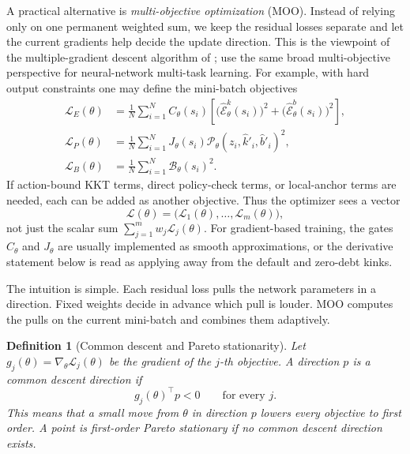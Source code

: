 \documentclass[11pt]{article}
\newtheorem{definition}{Definition}
\newcommand{\1}{\mathbf{1}}
\begin{document}
A practical alternative is \emph{multi-objective optimization} (MOO). Instead
of relying only on one permanent weighted sum, we keep the residual losses
separate and let the current gradients help decide the update direction. This
is the viewpoint of the multiple-gradient descent algorithm of
\citet{desideri2012mgda}; \citet{sener2018mtlmoo} use the same broad
multi-objective perspective for neural-network multi-task learning. For example,
with hard output constraints one may define the mini-batch objectives
\begin{align}
  \mathcal L_E(\theta)
  &=
  \frac{1}{N}\sum_{i=1}^N
  C_\theta(s_i)
  \left[
    \bigl(\widehat{\mathcal E}^k_\theta(s_i)\bigr)^2
    +\bigl(\widehat{\mathcal E}^b_\theta(s_i)\bigr)^2
  \right],
  \label{eq:moo-euler-loss}\\
  \mathcal L_P(\theta)
  &=
  \frac{1}{N}\sum_{i=1}^N
  J_\theta(s_i)
  \mathcal P_\theta(z_i,\widehat k'_i,\widehat b'_i)^2,
  \label{eq:moo-pricing-loss}\\
  \mathcal L_B(\theta)
  &=
  \frac{1}{N}\sum_{i=1}^N
  \mathcal B_\theta(s_i)^2.
  \label{eq:moo-bellman-loss}
\end{align}
If action-bound KKT terms, direct policy-check terms, or local-anchor terms are
needed, each can be added as another objective. Thus the optimizer sees a vector
\[
  \mathcal L(\theta)
  =
  \bigl(\mathcal L_1(\theta),\ldots,\mathcal L_m(\theta)\bigr),
\]
not just the scalar sum \(\sum_{j=1}^m w_j\mathcal L_j(\theta)\).
For gradient-based training, the gates \(C_\theta\) and \(J_\theta\) are usually
implemented as smooth approximations, or the derivative statement below is read
as applying away from the default and zero-debt kinks.

The intuition is simple. Each residual loss pulls the network parameters in a
direction. Fixed weights decide in advance which pull is louder. MOO computes
the pulls on the current mini-batch and combines them adaptively.

\begin{definition}[Common descent and Pareto stationarity]
\label{def:common-descent}
Let \(g_j(\theta)=\nabla_\theta \mathcal L_j(\theta)\) be the gradient of the
\(j\)-th objective. A direction \(p\) is a \emph{common descent direction} if
\[
  g_j(\theta)^\top p < 0
  \qquad\text{for every }j.
\]
This means that a small move from \(\theta\) in direction \(p\) lowers every
objective to first order. A point is \emph{first-order Pareto stationary} if no
common descent direction exists.
\end{definition}
\end{document}
